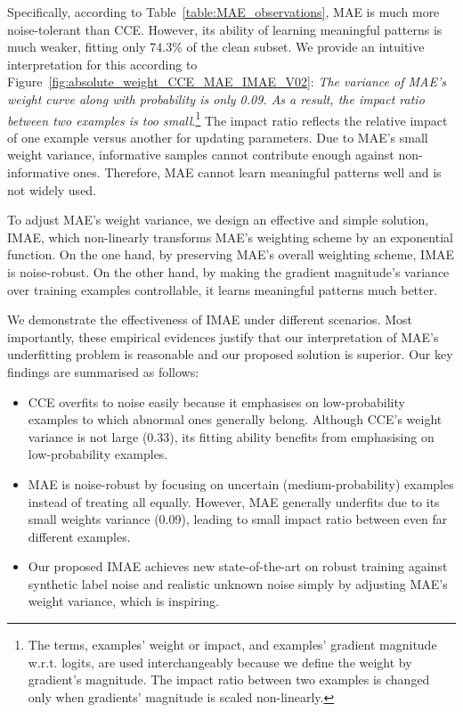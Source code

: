 \documentclass{article}
\begin{document}
Specifically, according to Table~\ref{table:MAE_observations}, MAE is much more noise-tolerant than CCE. However, its ability of learning meaningful patterns is much weaker, fitting only 74.3\% of the clean subset. We provide an intuitive interpretation for this according to Figure~\ref{fig:absolute_weight_CCE_MAE_IMAE_V02}:
\textit{The variance of MAE's weight curve along with probability is only 0.09. As a result, the impact ratio between two examples is too small}.\footnote{The terms, examples' weight or impact, and examples' gradient magnitude w.r.t. logits, are used interchangeably because we define the weight by gradient's magnitude. The impact ratio between two examples is changed only when gradients' magnitude is scaled non-linearly.}
The impact ratio reflects the relative impact of one example versus another for updating parameters.
Due to MAE's small weight variance, informative samples cannot contribute enough against non-informative ones. 
Therefore, MAE cannot learn meaningful patterns well and is not widely used.

To adjust MAE's weight variance, we design an effective and simple solution, IMAE, which non-linearly transforms MAE's weighting scheme by an exponential function. 
On the one hand, by preserving MAE's overall weighting scheme, IMAE is noise-robust. On the other hand, by making the gradient magnitude's variance over training examples controllable, it learns meaningful patterns much better.





We demonstrate the effectiveness of IMAE under different scenarios.
Most importantly, these empirical evidences justify that our interpretation of MAE's underfitting problem is reasonable and our proposed solution is superior. Our key findings are summarised as follows: 
\begin{itemize}
	\vspace{-0.3cm}
	\item CCE overfits to noise easily because it emphasises on low-probability examples to which abnormal ones generally belong. Although CCE's weight variance is not large (0.33), its fitting ability benefits from emphasising on low-probability examples. 
	
	\vspace{-0.2cm}
	\item MAE is noise-robust by focusing on uncertain (medium-probability) examples instead of treating all equally.  However, MAE generally underfits due to its small weights variance (0.09), leading to small impact ratio between even far different examples.
	  
	\vspace{-0.2cm}
	\item Our proposed IMAE achieves new state-of-the-art on robust training against synthetic label noise and realistic unknown noise simply by adjusting MAE's weight variance, which is inspiring.
	\vspace{-0.2cm}
\end{itemize}
\end{document}
